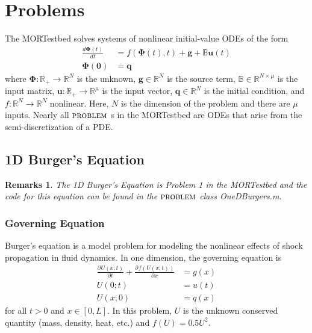 \documentclass[notitlepage]{report}
\newtheorem*{Rem}{Remarks}
\newcommand{\problem}{\ensuremath{\textsc{problem }}}
\newcommand{\pder}[3]{\ensuremath{\frac{\partial ^{ #3} { #1 }}{\partial { #2 }^{#3}}}}
\newcommand{\func}[3]{\ensuremath{#1 : #2 \rightarrow #3}}
\newcommand{\RR}{\ensuremath{\mathbb{R} }}
\begin{document}
\section{Problems}
The MORTestbed solves systems of nonlinear initial-value ODEs of the form
\begin{align}\label{eqn:odeform}
\frac{d \mathbf{\Phi}(t)}{d t} &= f(\mathbf{\Phi}(t), t) + \mathbf{g} + \mathbb{B}\mathbf{u}(t) \\
 \mathbf{\Phi(0)} &= \mathbf{q}
\end{align}
where $\func{\mathbf{\Phi}}{\RR_+}{\RR^N}$ is the unknown, $\mathbf{g} \in \RR^N$ is the source term, $\mathbb{B} \in \RR^{N\times\mu}$ is the input matrix, $\func{\mathbf{u}}{\RR_+}{\RR^\mu}$ is the input vector, $\mathbf{q} \in \RR^N$ is the initial condition, and $\func{f}{\RR^N}{\RR^N}$ nonlinear.  Here, $N$ is the dimension of the problem and there are $\mu$ inputs.  Nearly all \problem s in the MORTestbed are ODEs that arise from the semi-discretization of a PDE.

\subsection{1D Burger's Equation}
\begin{Rem}
The 1D Burger's Equation is Problem 1 in the MORTestbed and the code for this equation can be found in the \problem class OneDBurgers.m.
\end{Rem}
\subsubsection{Governing Equation}
Burger's equation is a model problem for modeling the nonlinear effects of shock propagation in fluid dynamics.  In one dimension, the governing equation is
\begin{align*}\label{eqn:burger}
\pder{U(x;t)}{t}{} + \pder{f(U(x;t))}{x}{} &= g(x) \\
U(0; t) &= u(t) \\
U(x; 0) &= q(x)
\end{align*}
for all $t > 0$ and $x \in [0, L]$.  In this problem, $U$ is the unknown conserved quantity  (mass, density, heat, etc.) and $f(U) = 0.5U^2$.  
\end{document}
